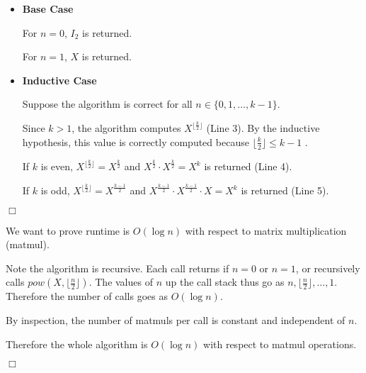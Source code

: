 \documentclass[10pt]{article}
\newenvironment{proof}{\par\noindent{\it Proof.}\hspace*{1em}}{$\Box$\bigskip}
\begin{document}
{\begin{enumerate} [(a)]
{\begin{proof}
                \begin{itemize}
                    \item {
                        \textbf{Base Case}

                        For $n=0$, $I_2$ is returned.

                        For $n=1$, $X$ is returned. 
                    }

                    \item {
                        \textbf{Inductive Case}
                        
                        Suppose the algorithm is correct for all $n \in \{0, 1, \dots, k-1\}$. 
        
                        Since $k > 1$, the algorithm computes $X^{\lfloor \frac{k}{2} \rfloor}$ (Line 3). 
                        By the inductive hypothesis, this value is correctly computed because ${\lfloor \frac{k}{2} \rfloor} \le k-1$ . 
        
                        If $k$ is even, $X^{\lfloor \frac{k}{2} \rfloor} = X^{\frac{k}{2}}$ and $X^{\frac{k}{2}} \cdot X^{\frac{k}{2}} = X^k$ is returned (Line 4). 
        
                        If $k$ is odd, $X^{\lfloor \frac{k}{2} \rfloor} = X^{\frac{k - 1}{2}}$ and $X^{\frac{k-1}{2}} \cdot X^{\frac{k-1}{2}} \cdot X = X^k$ is returned (Line 5). 
                    }
                \end{itemize}
            \end{proof}

            \begin{proof}
                
                We want to prove runtime is $O(\log n)$ with respect to matrix multiplication (matmul). 

                Note the algorithm is recursive. 
                Each call returns if $n=0$ or $n=1$, or recursively calls $pow(X, \lfloor \frac{n}{2} \rfloor)$. 
                The values of $n$ up the call stack thus go as $n, \lfloor \frac{n}{2} \rfloor, \dots, 1$. 
                Therefore the number of calls goes as $O(\log n)$. 
                
                By inspection, the number of matmuls per call is constant and independent of $n$. 

                Therefore the whole algorithm is $O(\log n)$ with respect to matmul operations. 

            \end{proof}
        }


\end{enumerate}}
\end{document}
